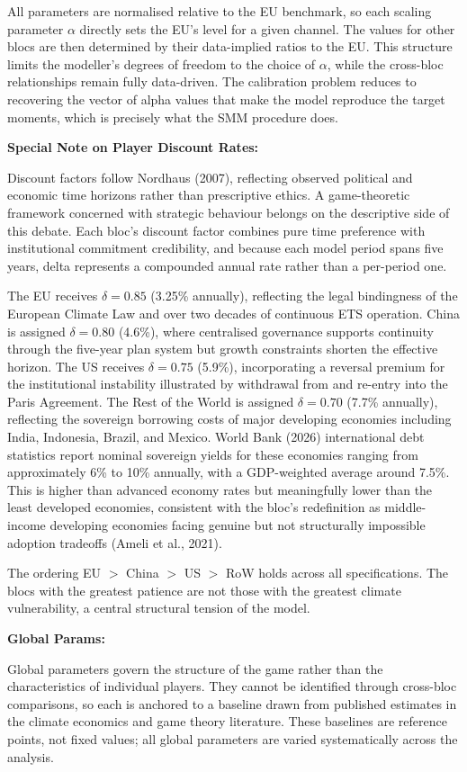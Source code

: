 \documentclass[10pt,a4paper]{article}
\newcommand{\bpar}[1]{\medskip\noindent\textbf{#1}\par}
\begin{document}
All parameters are normalised relative to the EU benchmark, so each scaling parameter $\alpha$ directly
sets the EU's level for a given channel. The values for other blocs are then determined by their
data-implied ratios to the EU. This structure limits the modeller's degrees of freedom to the choice of
$\alpha$, while the cross-bloc relationships remain fully data-driven. The calibration problem reduces to
recovering the vector of alpha values that make the model reproduce the target moments, which is
precisely what the SMM procedure does.

\bpar{Special Note on Player Discount Rates:}
Discount factors follow Nordhaus (2007), reflecting observed political and economic time horizons rather
than prescriptive ethics. A game-theoretic framework concerned with strategic behaviour belongs on the
descriptive side of this debate. Each bloc's discount factor combines pure time preference with
institutional commitment credibility, and because each model period spans five years, delta represents a
compounded annual rate rather than a per-period one.

The EU receives $\delta = 0.85$ (3.25\% annually), reflecting the legal bindingness of the European Climate Law
and over two decades of continuous ETS operation. China is assigned $\delta = 0.80$ (4.6\%), where centralised
governance supports continuity through the five-year plan system but growth constraints shorten the
effective horizon. The US receives $\delta = 0.75$ (5.9\%), incorporating a reversal premium for the institutional
instability illustrated by withdrawal from and re-entry into the Paris Agreement. The Rest of the World is
assigned $\delta = 0.70$ (7.7\% annually), reflecting the sovereign borrowing costs of major developing
economies including India, Indonesia, Brazil, and Mexico. World Bank (2026) international debt statistics
report nominal sovereign yields for these economies ranging from approximately 6\% to 10\% annually,
with a GDP-weighted average around 7.5\%. This is higher than advanced economy rates but
meaningfully lower than the least developed economies, consistent with the bloc's redefinition as
middle-income developing economies facing genuine but not structurally impossible adoption tradeoffs
(Ameli et al., 2021).

The ordering EU $>$ China $>$ US $>$ RoW holds across all specifications. The blocs with the greatest patience are not those with the greatest climate vulnerability, a central structural tension of the model.

\bpar{Global Params:}
Global parameters govern the structure of the game rather than the characteristics of individual players.
They cannot be identified through cross-bloc comparisons, so each is anchored to a baseline drawn from
published estimates in the climate economics and game theory literature. These baselines are reference points, not fixed values; all global parameters are varied systematically across the analysis.
\end{document}

